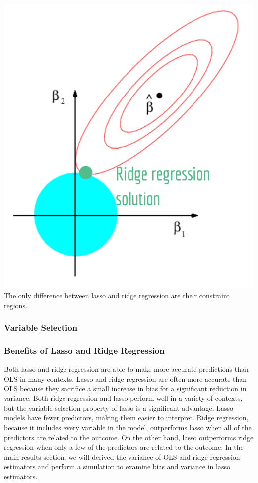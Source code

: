 \documentclass[
]{article}
\begin{document}
\includegraphics{ridge_vis.png} The only difference between lasso and
ridge regression are their constraint regions.

\hypertarget{variable-selection}{%
\subsubsection{Variable Selection}\label{variable-selection}}

\hypertarget{benefits-of-lasso-and-ridge-regression}{%
\subsubsection{Benefits of Lasso and Ridge
Regression}\label{benefits-of-lasso-and-ridge-regression}}

Both lasso and ridge regression are able to make more accurate
predictions than OLS in many contexts. Lasso and ridge regression are
often more accurate than OLS because they sacrifice a small increase in
bias for a significant reduction in variance. Both ridge regression and
lasso perform well in a variety of contexts, but the variable selection
property of lasso is a significant advantage. Lasso models have fewer
predictors, making them easier to interpret. Ridge regression, because
it includes every variable in the model, outperforms lasso when all of
the predictors are related to the outcome. On the other hand, lasso
outperforms ridge regression when only a few of the predictors are
related to the outcome. In the main results section, we will derived the
variance of OLS and ridge regression estimators and perform a simulation
to examine bias and variance in lasso estimators.
\end{document}
